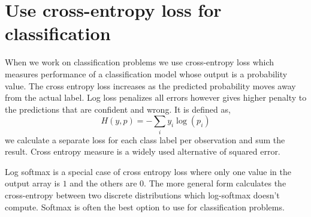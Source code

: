 {\centering{}\par}

\section{Use cross-entropy loss for classification}
When we work on classification problems we use cross-entropy loss which measures performance of a classification model whose output is a probability value. The cross entropy loss increases as the predicted probability moves away from the actual label. Log loss penalizes all errors however gives higher penalty to the predictions that are confident and wrong. It is defined as,
\begin{equation}
H(y, p)=-\sum_i y_i \log(p_i)
\end{equation}
we calculate a separate loss for each class label per observation and sum the result. Cross entropy measure is a widely used alternative of squared error.\\

{\centering{}\par}
\vspace{5pt}
Log softmax is a special case of cross entropy loss where only one value in the output array is $1$ and the others are $0$. The more general form calculates the cross-entropy between two discrete distributions which log-softmax doesn’t compute. Softmax is often the best option to use for classification problems. 

